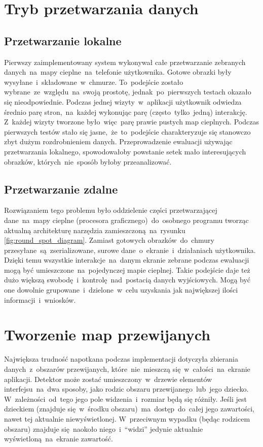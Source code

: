\section{Tryb przetwarzania danych}

\subsection{Przetwarzanie lokalne}
Pierwszy zaimplementowany system wykonywał całe przetwarzanie zebranych danych~na~mapy cieplne~na~telefonie użytkownika. Gotowe obrazki były wysyłane~i~składowane~w~chmurze. To~podejście zostało wybrane~ze~względu~na~swoją prostotę, jednak~po~pierwszych testach okazało się nieodpowiednie. Podczas jednej wizyty~w~aplikacji  użytkownik odwiedza średnio parę stron,~na~każdej wykonując parę (często~tylko~jedną) interakcję. Z~każdej wizyty tworzone było~więc~parę prawie pustych map cieplnych. Podczas pierwszych testów stało się jasne,~że~to~podejście charakteryzuje się stanowczo zbyt dużym rozdrobnieniem danych. Przeprowadzenie ewaluacji używając przetwarzania lokalnego, spowodowałoby powstanie setek mało interesujących obrazków, których~nie~sposób byłoby przeanalizować.

\subsection{Przetwarzanie zdalne}
Rozwiązaniem tego problemu było oddzielenie części przetwarzającej dane~na~mapy cieplne (procesora graficznego)~do~osobnego programu tworząc aktualną architekturę narzędzia zamieszczoną~na~rysunku \ref{fig:round_spot_diagram}. Zamiast gotowych obrazków~do~chmury przesyłane~są~zserializowane, surowe dane~o~ekranie~i~działaniach użytkownika. Dzięki temu wszystkie interakcje~na~danym ekranie zebrane podczas ewaluacji mogą być umieszczone~na~pojedynczej mapie cieplnej. Takie podejście daje też dużo większą swobodę~i~kontrolę~nad~postacią danych wyjściowych. Mogą być one dowolnie grupowane~i~dzielone~w~celu uzyskania jak największej ilości informacji~i~wniosków.

\section{Tworzenie map przewijanych}
Największa trudność napotkana podczas implementacji dotyczyła zbierania danych~z~obszarów przewijanych, które~nie~mieszczą się~w~całości~na~ekranie aplikacji. Detektor może zostać umieszczony~w~drzewie elementów interfejsu~na~dwa sposoby, jako rodzic obszaru przewijanego~lub~jego dziecko. W~zależności~od~tego jego pole widzenia~i~rozmiar będą się różniły. Jeśli jest dzieckiem (znajduje się~w~środku obszaru)~ma~dostęp~do~całej jego zawartości, nawet tej aktualnie niewyświetlonej. W~przeciwnym wypadku (będąc rodzicem obszaru) znajduje się~naokoło niego~i~``widzi'' jedynie aktualnie wyświetloną~na~ekranie zawartość.

